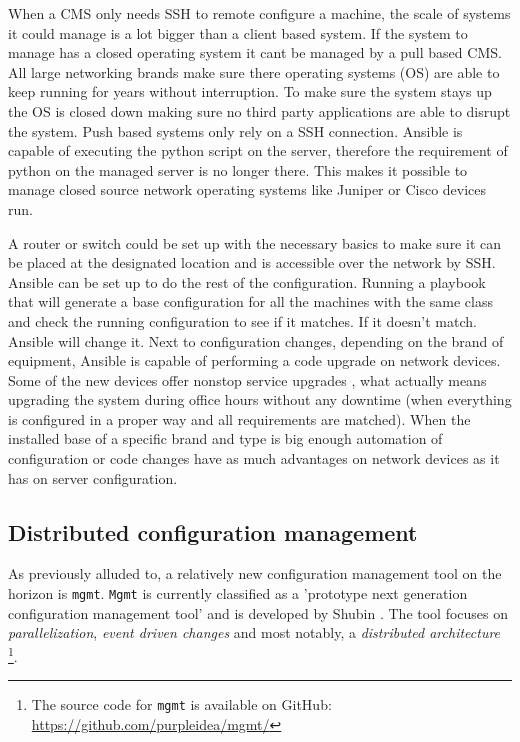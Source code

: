 When a CMS only needs SSH to remote configure a machine, the scale of systems it could manage is a lot bigger than a client based system. If the system to manage has a closed operating system it cant be managed by a pull based CMS. All large networking brands make sure there operating systems (OS) are able to keep running for years without interruption. To make sure the system stays up the OS is closed down making sure no third party applications are able to disrupt the system. Push based systems only rely on a SSH connection. Ansible is capable of executing the python script on the server, therefore the requirement of python on the managed server is no longer there. This makes it possible to manage closed source network operating systems like Juniper or Cisco devices run. 

A router or switch could be set up with the necessary basics to make sure it can be placed at the designated location and is accessible over the network by SSH. Ansible can be set up to do the rest of the configuration. Running a playbook that will generate a base configuration for all the machines with the same class and check the running configuration to see if it matches. If it doesn't match. Ansible will change it. Next to configuration changes, depending on the brand of equipment, Ansible is capable of performing a code upgrade on network devices. Some of the new devices offer nonstop service upgrades \cite{NSSU}\cite{ISSU}, what actually means upgrading the system during office hours without any downtime (when everything is configured in a proper way and all requirements are matched). When the installed base of a specific brand and type is big enough automation of configuration or code changes have as much advantages on network devices as it has on server configuration.  

\subsection{Distributed configuration management}\label{subsec:distributedmgmt}
As previously alluded to, a relatively new configuration management tool on the horizon is \texttt{mgmt}. \texttt{Mgmt} is currently classified as a 'prototype next generation configuration management tool' and is developed by Shubin \cite{shubin2016}. The tool focuses on \textit{parallelization}, \textit{event driven changes} and most notably, a \textit{distributed architecture} \footnote{The source code for \texttt{mgmt} is available on GitHub: \url{https://github.com/purpleidea/mgmt/}}. 

